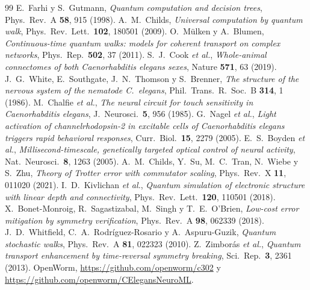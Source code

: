 \documentclass[11pt,a4paper]{article}
\theoremstyle{plain}
\theoremstyle{definition}
\theoremstyle{remark}
\begin{document}
\begin{thebibliography}{99}
 E.~Farhi y S.~Gutmann, \emph{Quantum computation and decision trees}, Phys.\ Rev.\ A \textbf{58}, 915 (1998).
 A.~M.~Childs, \emph{Universal computation by quantum walk}, Phys.\ Rev.\ Lett.\ \textbf{102}, 180501 (2009).
 O.~Mülken y A.~Blumen, \emph{Continuous-time quantum walks: models for coherent transport on complex networks}, Phys.\ Rep.\ \textbf{502}, 37 (2011).
 S.~J.~Cook \emph{et al.}, \emph{Whole-animal connectomes of both Caenorhabditis elegans sexes}, Nature \textbf{571}, 63 (2019).
 J.~G.~White, E.~Southgate, J.~N.~Thomson y S.~Brenner, \emph{The structure of the nervous system of the nematode C.~elegans}, Phil.\ Trans.\ R.\ Soc.\ B \textbf{314}, 1 (1986).
 M.~Chalfie \emph{et al.}, \emph{The neural circuit for touch sensitivity in Caenorhabditis elegans}, J.\ Neurosci.\ \textbf{5}, 956 (1985).
 G.~Nagel \emph{et al.}, \emph{Light activation of channelrhodopsin-2 in excitable cells of Caenorhabditis elegans triggers rapid behavioral responses}, Curr.\ Biol.\ \textbf{15}, 2279 (2005).
 E.~S.~Boyden \emph{et al.}, \emph{Millisecond-timescale, genetically targeted optical control of neural activity}, Nat.\ Neurosci.\ \textbf{8}, 1263 (2005).
 A.~M.~Childs, Y.~Su, M.~C.~Tran, N.~Wiebe y S.~Zhu, \emph{Theory of Trotter error with commutator scaling}, Phys.\ Rev.\ X \textbf{11}, 011020 (2021).
 I.~D.~Kivlichan \emph{et al.}, \emph{Quantum simulation of electronic structure with linear depth and connectivity}, Phys.\ Rev.\ Lett.\ \textbf{120}, 110501 (2018).
 X.~Bonet-Monroig, R.~Sagastizabal, M.~Singh y T.~E.~O'Brien, \emph{Low-cost error mitigation by symmetry verification}, Phys.\ Rev.\ A \textbf{98}, 062339 (2018).
 J.~D.~Whitfield, C.~A.~Rodríguez-Rosario y A.~Aspuru-Guzik, \emph{Quantum stochastic walks}, Phys.\ Rev.\ A \textbf{81}, 022323 (2010).
 Z.~Zimborás \emph{et al.}, \emph{Quantum transport enhancement by time-reversal symmetry breaking}, Sci.\ Rep.\ \textbf{3}, 2361 (2013).
 OpenWorm, \url{https://github.com/openworm/c302} y \url{https://github.com/openworm/CElegansNeuroML}.
\end{thebibliography}
\end{document}
